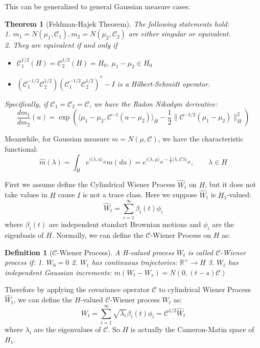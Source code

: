 \documentclass{article}
\newtheorem{theorem}{Theorem}
\newtheorem{definition}{Definition}
\begin{document}
This can be generalized to general Gaussian measure cases:
\begin{theorem}[Feldman-Hajek Theorem\cite{Prato_Zabczyk_2014}]
  The following statements hold:\\
  1. $m_1 = N(\mu_1, \mathcal{C}_1), m_2 = N(\mu_2, \mathcal{C}_2)$ are either singular or equivalent.\\
  2. They are equivalent if and only if 
  \begin{itemize}
      \item $\mathcal{C}_1^{1/2}(H) = \mathcal{C}_2^{1/2}(H)=H_0$, $\mu_1 - \mu_2 \in H_0$
      \item $(\mathcal{C}_1^{-1/2}\mathcal{C}_2^{1/2})(\mathcal{C}_1^{-1/2}\mathcal{C}_2^{1/2})^*-I$ is a Hilbert-Schmidt operator.
  \end{itemize}
  Specifically, if $\mathcal{C}_1=\mathcal{C}_2=\mathcal{C}$, we have the Radon Nikodym derivative:
  \begin{equation} 
    \frac{dm_1}{dm_2}(u) = \exp{\left(\langle \mu_1 - \mu_2, \mathcal{C}^{-1}(u - \mu_2) \rangle_H - \frac{1}{2}\|\mathcal{C}^{-1/2}(\mu_1 - \mu_2)\|^2_H\right)}
  \end{equation}
\end{theorem}
Meanwhile, for Gaussian measure $m=N(\mu, \mathcal{C})$, we have the characteristic functional:
\begin{equation}
  \hat{m}(\lambda) = \int_H e^{i\langle \lambda, u\rangle_H} m(du) = e^{i\langle \lambda, \mu\rangle_H-\frac{1}{2}\langle \lambda, \mathcal{C}\lambda\rangle_H}, \qquad \lambda\in H
\end{equation}

First we assume define the Cylindrical Wiener Process $\hat{W}_t$ on $H$, but it does not take values in $H$ cause $I$ is not a trace class.
Here we suppose $\hat{W}_t$ is $H_1$-valued:
\begin{equation}
  \hat{W}_t = \sum_{i=1}^{\infty} \beta_i(t) \phi_i
\end{equation}
where $\beta_i(t)$ are independent standart Brownian motions and $\phi_i$ are the eigenbasis of $H$.
Normally, we can define the $\mathcal{C}$-Wiener Process on $H$ as:
\begin{definition}[$\mathcal{C}$-Wiener Process]
  A H-valued process $W_t$ is called $\mathcal{C}$-Wiener process if:
  1. $W_0 = 0$
  2. $W_t$ has continuous trajectories: $\mathbb{R}^+\rightarrow H$
  3. $W_t$ has independent Gaussian increments: $m(W_t - W_s) = N(0, (t-s)\mathcal{C})$
\end{definition}
Therefore by applying the covariance operator $\mathcal{C}$ to cylindrical Wiener Process $\hat{W}_t$, we can define the $H$-valued $\mathcal{C}$-Wiener process $W_t$ as:
\begin{equation}
  W_t = \sum_{i=1}^{\infty} \sqrt{\lambda_i} \beta_i(t) \phi_i = \mathcal{C}^{1/2}\hat{W}_t
\end{equation}
where $\lambda_i$ are the eigenvalues of $\mathcal{C}$. 
So $H$ is actually the Cameron-Matin space of $H_1$.
\end{document}
